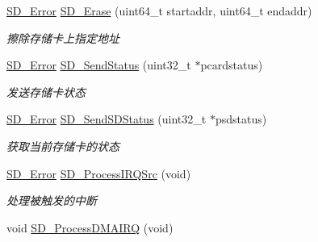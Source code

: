 \begin{DoxyCompactItemize}
\hyperlink{group__sd__card_gacff91fa68daa1d1ee967b5b3fb3dbd8c}{S\+D\+\_\+\+Error} \hyperlink{group__sd__card_gaca2450c63f52cd6c1d50f6de33ecfdf8}{S\+D\+\_\+\+Erase} (uint64\+\_\+t startaddr, uint64\+\_\+t endaddr)
\begin{DoxyCompactList}\small\item\em 擦除存储卡上指定地址 \end{DoxyCompactList}\item 
\hyperlink{group__sd__card_gacff91fa68daa1d1ee967b5b3fb3dbd8c}{S\+D\+\_\+\+Error} \hyperlink{group__sd__card_ga7de24baeb4c6a7c9e5668630b8797888}{S\+D\+\_\+\+Send\+Status} (uint32\+\_\+t $\ast$pcardstatus)
\begin{DoxyCompactList}\small\item\em 发送存储卡状态 \end{DoxyCompactList}\item 
\hyperlink{group__sd__card_gacff91fa68daa1d1ee967b5b3fb3dbd8c}{S\+D\+\_\+\+Error} \hyperlink{group__sd__card_gab573516bdaa3054877172415e66d0e57}{S\+D\+\_\+\+Send\+S\+D\+Status} (uint32\+\_\+t $\ast$psdstatus)
\begin{DoxyCompactList}\small\item\em 获取当前存储卡的状态 \end{DoxyCompactList}\item 
\hyperlink{group__sd__card_gacff91fa68daa1d1ee967b5b3fb3dbd8c}{S\+D\+\_\+\+Error} \hyperlink{group__sd__card_gab21b0412e865d8cabc915dc840fa1ccc}{S\+D\+\_\+\+Process\+I\+R\+Q\+Src} (void)
\begin{DoxyCompactList}\small\item\em 处理被触发的中断 \end{DoxyCompactList}\item 
void \hyperlink{group__sd__card_ga52ec18498c19918549142f6680a7b21e}{S\+D\+\_\+\+Process\+D\+M\+A\+I\+RQ} (void)\hypertarget{group__sd__card_ga52ec18498c19918549142f6680a7b21e}{}\label{group__sd__card_ga52ec18498c19918549142f6680a7b21e}


\end{DoxyCompactItemize}
